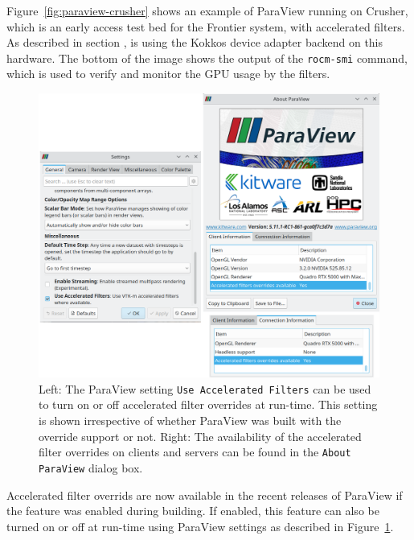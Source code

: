 Figure~\ref{fig:paraview-crusher} shows an example of ParaView running on Crusher, which is an early access test bed for the Frontier system, with \vtkm accelerated filters.
As described in section , \vtkm is using the Kokkos device adapter backend on this hardware.
The bottom of the image shows the output of the \texttt{rocm-smi} command, which is used to verify and monitor the GPU usage by the filters.

\begin{figure}[htb]
  \includegraphics[width=\linewidth]{figures/pv-override-settings.png}
  \caption{
    Left: The ParaView setting \texttt{Use Accelerated Filters} can be used to turn on or off accelerated filter overrides at run-time.
    This setting is shown irrespective of whether ParaView was built with the override support or not.
    Right: The availability of the accelerated filter overrides on clients and servers can be found in the \texttt{About ParaView} dialog box.
  }
  \label{fig:paraview_settings}
\end{figure}

Accelerated \vtkm filter overrids are now available in the recent releases of ParaView if the feature was enabled during building.
If enabled, this feature can also be turned on or off at run-time using ParaView settings as described in Figure~\ref{fig:paraview_settings}.

